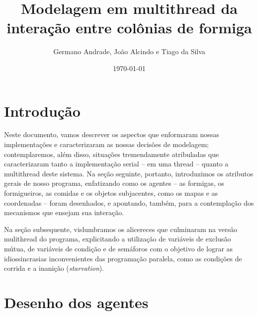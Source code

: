 \documentclass[12pt]{article}
\title{Modelagem em multithread da interação entre colônias de formiga}
\author{Germano Andrade, João Alcindo e Tiago da Silva}
\date{\today}
\theoremstyle{definition}
\begin{document}
  
	 
\maketitle  
\tableofcontents 

\section{Introdução} 

Neste documento, vamos descrever os aspectos que enformaram nossas implementações e caracterizaram as nossas decisões de modelagem; contemplaremos, além disso, situações tremendamente atribuladas que caracterizaram tanto a implementação serial -- em uma thread -- quanto a multithread deste sistema. Na seção seguinte, portanto, introduzimos os atributos gerais de nosso programa, enfatizando como os agentes -- as formigas, os formigueiros, as comidas e os objetos subjacentes, como os mapas e as coordenadas -- foram desenhados, e apontando, também, para a contemplação dos mecanismos que ensejam sua interação. 

Na seção subsequente, vislumbramos os alicereces que culminaram na versão mulithread do programa, explicitando a utilização de variáveis de exclusão mútua, de variáveis de condição e de semáforos com o objetivo de lograr as idiossincrasias inconvenientes das programação paralela, como as condições de corrida e a inanição (\textit{starvation}). 

\section{Desenho dos agentes} 
\end{document}
